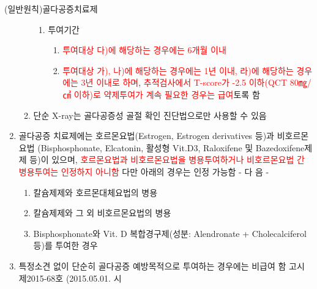 \begin{commentbox}{(일반원칙)골다공증치료제}
\begin{enumerate}[1.]
\begin{enumerate}[가.]
\begin{enumerate}[1)]
		\item 투여기간
			\begin{enumerate}[가)]\tightlist
			\item \textcolor{red}{투여대상 다)에 해당하는 경우에는 6개월 이내}
			\item \textcolor{red}{투여대상 가), 나)에 해당하는 경우에는 1년 이내, 라)에 해당하는 경우에는 3년 이내로 하며}, \textcolor{red}{추적검사에서 T-score가 -2.5 이하(QCT 80㎎/㎤ 이하)로 약제투여가 계속 필요한 경우는 급여}토록 함
			\end{enumerate}
		\end{enumerate}
	\item 단순 X-ray는 골다공증성 골절 확인 진단법으로만 사용할 수 있음
	\end{enumerate}
\item 골다공증 치료제에는 호르몬요법(Estrogen, Estrogen derivatives 등)과 비호르몬요법 (Bisphosphonate, Elcatonin, 활성형 Vit.D3, Raloxifene 및 Bazedoxifene제제 등)이 있으며, \textcolor{red}{호르몬요법과 비호르몬요법을 병용투여하거나 비호르몬요법 간 병용투여는 인정하지 아니함} 다만 아래의 경우는 인정 가능함 \newline
- 다 음 -
	\begin{enumerate}[가.]\tightlist
	\item 칼슘제제와 호르몬대체요법의 병용
	\item 칼슘제제와 그 외 비호르몬요법의 병용
	\item Bisphosphonate와 Vit. D 복합경구제(성분: Alendronate + Cholecalciferol 등)를 투여한 경우
	\end{enumerate}
\item 특정소견 없이 단순히 골다공증 예방목적으로 투여하는 경우에는 비급여 함  고시 제2015-68호 (2015.05.01. 시
\end{enumerate}
\end{commentbox}




